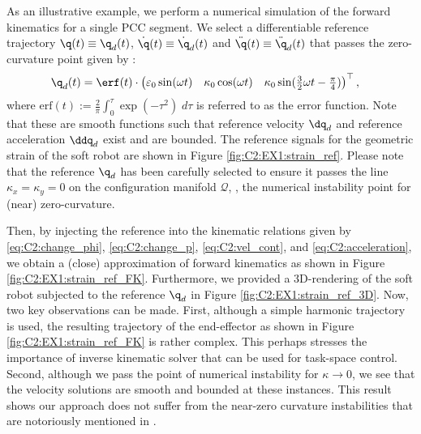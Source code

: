 \begin{example}
As an illustrative example, we perform a numerical simulation of the forward kinematics for a single PCC segment. We select a differentiable reference trajectory $\q(t) \equiv \q_d(t)$, $\dot{\q}(t) \equiv \dot{\q}_d(t)$ and $\ddot{\q}(t) \equiv \ddot{\q}_d(t)$ that passes the zero-curvature point  given by :
%
\begin{align*}
\q_d(t) &  =  \erf(t) \cdot \begin{pmatrix} \varepsilon_0 \sin(\omega t) & \kappa_0 \cos(\omega t) & \kappa_0 \sin(\tfrac{3}{2}\omega t - \tfrac{\pi}{4}) \end{pmatrix}^\top,
\end{align*}
%
where $\textrm{erf}(t) := \frac{2}{\pi}\int_0^\tau \exp(-\tau^2) \; d\tau$ is referred to as the error function. Note that these are smooth functions such that reference velocity $\dq_d$ and reference acceleration $\ddq_d$ exist and are bounded. The reference signals for the geometric strain of the soft robot are shown in Figure \ref{fig:C2:EX1:strain_ref}. Please note that the reference $\q_d$ has been carefully selected to ensure it passes the line $\kappa_x = \kappa_y = 0$ on the configuration manifold
$\mathcal{Q}$, \ie, the numerical instability point for (near) zero-curvature.

Then, by injecting the reference into the kinematic relations given by \eqref{eq:C2:change_phi}, \eqref{eq:C2:change_p}, \eqref{eq:C2:vel_cont}, and \eqref{eq:C2:acceleration}, we obtain a (close) approximation of forward kinematics as shown in Figure
\ref{fig:C2:EX1:strain_ref_FK}. Furthermore, we provided a 3D-rendering of the soft robot subjected to the reference $\q_d$ in Figure \ref{fig:C2:EX1:strain_ref_3D}. Now, two key observations can be made. First, although a simple harmonic trajectory is used, the resulting trajectory of the end-effector as shown in Figure \ref{fig:C2:EX1:strain_ref_FK} is rather complex. This perhaps stresses the importance of inverse kinematic solver that can be used for task-space control. Second, although we pass the point of numerical instability for $\kappa \to 0$, we see that the velocity solutions are smooth and bounded at these instances. This result shows our approach does not suffer from the near-zero curvature instabilities that are notoriously mentioned in \cite{Falkenhahn2015,DellaSantina2020}. 
\end{example}
%


